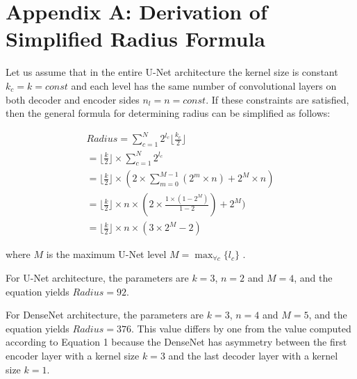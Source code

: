 %
%
%
%
%
%


\section{Appendix A: Derivation of Simplified Radius Formula}

Let us assume that in the entire U-Net architecture the kernel size is constant $k_{c} = k = const$ and each level has the same number of convolutional layers on both decoder and encoder sides $n_{l} = n = const$. If these constraints are satisfied, then the general formula for determining radius can be simplified as follows:

\begin{equation}
\begin{aligned}
Radius = \sum_{c=1}^{N} 2^{l_c} \lfloor \frac{k_c}{2} \rfloor \\
= \lfloor \frac{k}{2} \rfloor \times \sum_{c=1}^{N} 2^{l_c} \\
= \lfloor \frac{k}{2} \rfloor \times ( 2 \times \sum_{m=0}^{M-1} (2^{m} \times n) + 2^{M} \times n )  \\
= \lfloor \frac{k}{2} \rfloor \times n \times ( 2 \times \frac{1 \times (1 - 2^M) }{ 1- 2} ) + 2^{M} )  \\
= \lfloor \frac{k}{2} \rfloor \times n \times (3 \times 2^{M} - 2) 
\end{aligned}
\label{eq:radius2}
\end{equation}

where $M$ is the maximum U-Net level $M = \max_{\forall c}\{ l_{c} \}$ .

For U-Net architecture, the parameters are $k = 3$, $n=2$ and $M=4$, and the equation yields $Radius=92$.

For DenseNet architecture, the parameters are $k = 3$, $n=4$ and $M=5$, and the equation yields $Radius=376$. This value differs by one from the value computed according to Equation 1 because the DenseNet has asymmetry between the first encoder layer with a kernel size $k = 3$ and the last decoder layer with a kernel size $k = 1$.   



